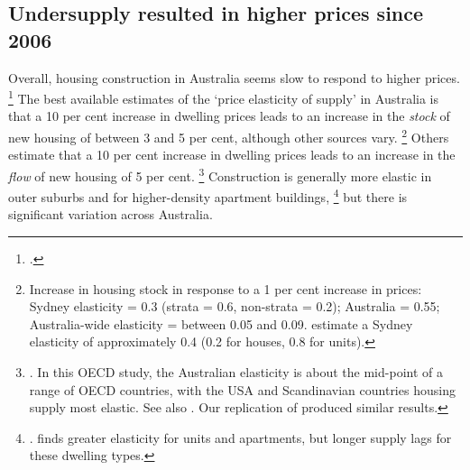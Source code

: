 
\subsection{Undersupply resulted in higher prices since 2006}\label{subsec:undersupply-led-to-higher-prices}

Overall, housing construction in Australia seems slow to respond to higher prices.%
    \footcites{Treasury2013Housing}[][90]{IMF2018_ArticleIV}{OngEtAl-AHURI-2017-Housing-supply-responsiveness}
The best available estimates of the `price elasticity of supply' in Australia is that a 10 per cent increase in dwelling prices leads to an increase in the \emph{stock} of new housing of between 3 and 5 per cent, although other sources vary.%
    \footnote{Increase in housing stock in response to a 1 per cent increase in prices: \textcite{GitelmanOtto2012} Sydney elasticity = 0.3 (strata = 0.6, non-strata = 0.2); \textcite{Ball-etal-2010-Housing-supply-elasticities} Australia = 0.55; \textcite{OngEtAl-AHURI-2017-Housing-supply-responsiveness}
	Australia-wide elasticity = between 0.05 and 0.09. \textcite{Liu-Otto-2017-Housing-supply-elasticity-Syd-LGA} estimate a Sydney elasticity of approximately 0.4 (0.2 for houses, 0.8 for units).}
Others estimate that a 10 per cent increase in dwelling prices leads to an increase in the \emph{flow} of new housing of 5 per cent.%
    \footnote{\textcite{AndrewsEtAlHousing}.
	In this OECD study, the Australian elasticity is about the mid-point of a range of OECD countries, with the USA and Scandinavian countries housing supply most elastic. See also \textcite[][31]{IMF2018_ArticleIV}.
	Our replication of \textcite{AndrewsEtAlHousing} produced similar results.}
Construction is generally more elastic in outer suburbs and for higher-density apartment buildings,%
    \footnote{\textcites{GitelmanOtto2012}{Liu-Otto-2017-Housing-supply-elasticity-Syd-LGA}.
    \textcite{McLaughlinHousing2012} finds greater elasticity for units and apartments, but longer supply lags for these dwelling types.}
but there is significant variation across Australia.

